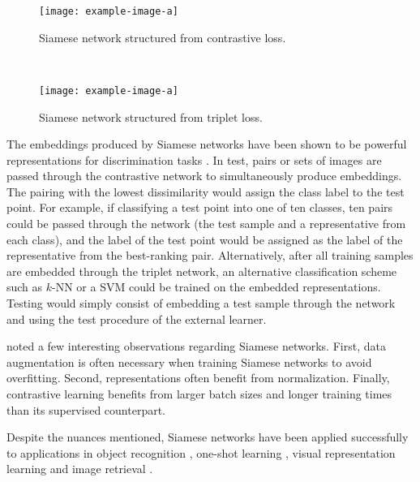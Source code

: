 		
		\begin{figure*}[h!]
			\hfill
			\begin{subfigure}[t]{0.5\textwidth}
				\texttt{[image: example-image-a]}
				\caption{Siamese network structured from contrastive loss.}
				\label{fig:siamese_networks_conrastive}
			\end{subfigure}%
			\centering
			~ 
			\begin{subfigure}[t]{0.5\textwidth}
				\centering
				\texttt{[image: example-image-a]}
				\caption{Siamese network structured from triplet loss.}
				\label{fig:siamese_networks_triplet}
			\end{subfigure}
		
			\caption[Siamese Neural Networks]{ }
			\label{fig:siamese_networks}%
		\end{figure*}
	
	
		The embeddings produced by Siamese networks have  been shown to be powerful representations for discrimination tasks \citep{Chen2020ContrastiveLearning, Schroff2015FaceNet, Koch2015SiameseNetworks}.  In test, pairs or sets of images are passed through the contrastive network to simultaneously produce embeddings.  The pairing with the lowest dissimilarity would assign the class label to the test point.  For example, if classifying a test point into one of ten classes, ten pairs could be passed through the network (the test sample and a representative from each class), and the label of the test point would be assigned as the label of the representative from the best-ranking pair.   Alternatively, after all training samples are embedded through the triplet network, an alternative classification scheme such as $k$-NN or a SVM could be trained on the embedded representations.  Testing would simply consist of embedding a test sample through the network and using the test procedure of the external learner.
		
		
		\cite{Chen2020ContrastiveLearning} noted a few interesting observations regarding Siamese networks. First, data augmentation is often necessary when training Siamese networks to avoid overfitting.  Second, representations often benefit from normalization. Finally, contrastive learning benefits from larger batch sizes and longer training times than its supervised counterpart.
		
		Despite the nuances mentioned, Siamese networks have been applied  successfully to applications in object recognition \citep{Hoffer2015DeepMetricLearning}, one-shot learning \citep{Koch2015SiameseNetworks}, visual representation learning \citep{Chen2020ContrastiveLearning} and image retrieval \citep{Hoffer2015DeepMetricLearning}.
		
